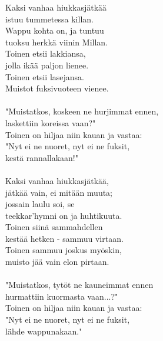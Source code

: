 
            Kaksi vanhaa hiukkasjätkää \\
            istuu tummetessa killan. \\
            Wappu kohta on, ja tuntuu \\
            tuoksu herkkä viinin Millan. \\
            Toinen etsii lakkiansa, \\
            jolla ikää paljon lienee. \\
            Toinen etsii lasejansa. \\
            Muistot fuksivuoteen vienee. \\
\hspace{10mm} \\
            "Muistatkos, koskeen ne hurjimmat ennen, \\
            laskettiin koreissa vaan?" \\
            Toinen on hiljaa niin kauan ja vastaa: \\
            "Nyt ei ne nuoret, nyt ei ne fuksit, \\
            kestä rannallakaan!" \\
\hspace{10mm} \\
            Kaksi vanhaa hiukkasjätkää, \\
            jätkää vain, ei mitään muuta; \\
            jossain laulu soi, se \\
            teekkar'hymni on ja huhtikuuta. \\
            Toinen siinä sammahdellen \\
            kestää hetken - sammuu virtaan. \\
            Toinen sammuu joskus myöskin, \\
            muisto jää vain elon pirtaan. \\
\hspace{10mm} \\
            "Muistatkos, tytöt ne kauneimmat ennen \\
            hurmattiin kuormasta vaan...?" \\
            Toinen on hiljaa niin kauan ja vastaa: \\
            "Nyt ei ne nuoret, nyt ei ne fuksit, \\
            lähde wappunakaan." \\
